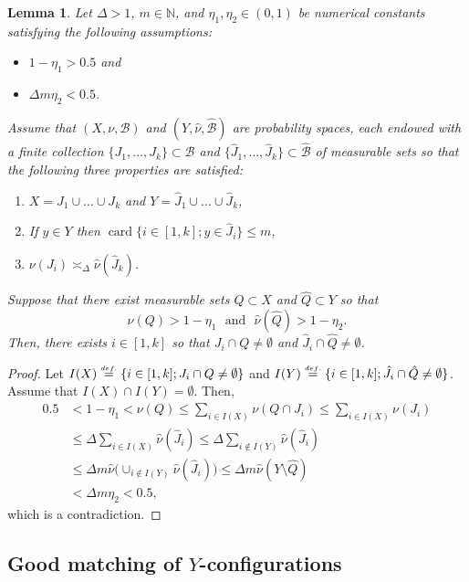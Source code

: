 \documentclass[a4paper,11pt,reqno]{amsart}
\newcommand{\N}{{\mathbb N}}
\newcommand{\cB}{{\mathcal B}}
\newcommand{\card}{\operatorname{card}}
\newcommand{\eqdef}{\stackrel{\scriptscriptstyle\textrm def.}{=}}
\newtheorem{lemma}[theorem]{Lemma}
\theoremstyle{definition}
\begin{document}
\begin{lemma}
    \label{lem:eskinmirza}
    Let $\Delta>1$,  $m\in\N$, and $\eta_1,\eta_2\in(0,1)$ be numerical constants satisfying the following assumptions:
    \begin{itemize}
        \item $1-\eta_1>0.5$ and
        \item $\Delta m\eta_2<0.5$.
    \end{itemize}
    Assume that $(X,\nu,\cB)$ and $(Y,\hat{\nu},\hat{\cB})$ are probability spaces, each endowed with a finite collection $\{J_1,...,J_k\}\subset\cB $ and $\{\hat{J}_1,\dots,\hat{J}_k\}\subset\hat{\cB}$ of measurable sets so that the following three properties are satisfied:
    \begin{enumerate}
        \item $X=J_1 \cup \dots \cup J_k$ and $Y=\hat{J}_1\cup\dots\cup\hat{J}_k$,
        \item If $y\in Y$ then $\card\{i\in[1,k];y\in \hat{J}_i\}\leq m$,
        \item $\nu(J_i)\asymp_{\Delta}\hat{\nu}(\hat{J}_k)$.
    \end{enumerate}
    Suppose that there exist measurable sets $Q \subset X$ and $\hat{Q} \subset Y$ so that
    \[
    \nu(Q)>1-\eta_1\:\:\:\textrm{and}\:\:\:\hat{\nu}(\hat{Q})>1-\eta_2.
    \]
    Then, there exists $i\in[1,k]$ so that $J_i\cap Q\neq\emptyset$ and $\hat{J}_i\cap\hat{Q}\neq\emptyset$. 
\end{lemma}
\begin{proof}
    Let $I(X)\eqdef\{i\in [1,k]; J_i\cap Q\neq\emptyset\}$  and $I(Y)\eqdef\{i\in[1,k]; \hat{J}_i\cap\hat{Q}\neq\emptyset\}$.  Assume that $I(X)\cap I(Y)=\emptyset$. Then, 
    \begin{align*}
        0.5&<1-\eta_1<\nu(Q)\leq\sum_{i\in I(X)}\nu(Q\cap J_i)\leq\sum_{i\in I(X)}\nu(J_i)\nonumber\\
        &\leq\Delta\sum_{i\in I(X)}\hat{\nu}(\hat{J}_i)\leq\Delta\sum_{i\notin I(Y)}\hat{\nu}(\hat{J}_i)\nonumber\\
        &\leq\Delta m\hat{\nu}\big(\cup_{i\notin I(Y)}\hat{\nu}(\hat{J}_i)\big)\leq\Delta m\hat{\nu}(Y\setminus\hat{Q})\nonumber\\
        &<\Delta m\eta_2<0.5,
    \end{align*}
which is a contradiction.
\end{proof}
\subsection{Good matching of $Y$-configurations}
\end{document}
